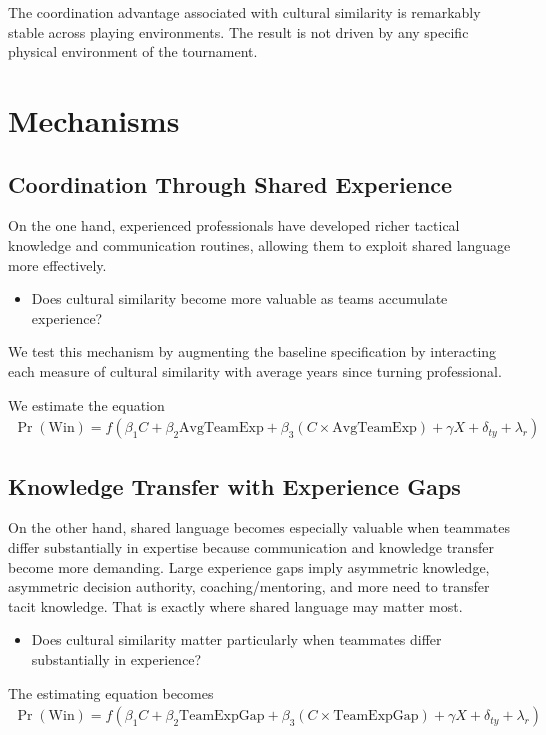 \documentclass[10pt]{article}
\begin{document}
The coordination advantage associated with cultural similarity is remarkably stable across playing environments. The result is not driven by any specific physical environment of the tournament.

\section{Mechanisms}
\subsection{Coordination Through Shared Experience} 


On the one hand, experienced professionals have developed richer tactical knowledge and communication routines, allowing them to exploit shared language more effectively. 

\begin{itemize}

\item Does cultural similarity become more valuable as teams accumulate experience? 
\end{itemize}
We test this mechanism by augmenting the baseline specification by interacting each measure of cultural similarity with average years since turning professional.

We estimate the equation 
\begin{align}
\operatorname{Pr}(\text{Win}) = f(\beta_1 C + \beta_2 \text{AvgTeamExp} + \beta_3 (C \times \text{AvgTeamExp}) + \gamma X + \delta_{ty} + \lambda_r)
\end{align}
\subsection{Knowledge Transfer with Experience Gaps} 

On the other hand, shared language becomes especially valuable when teammates differ substantially in expertise because communication and knowledge transfer become more demanding. Large experience gaps imply asymmetric knowledge, asymmetric decision authority, coaching/mentoring,
 and more need to transfer tacit knowledge. That is exactly where shared language may matter most.
\begin{itemize}
\item Does cultural similarity matter particularly when teammates differ substantially in experience?
\end{itemize}
The estimating equation becomes
\begin{align}
\operatorname{Pr}(\text{Win}) = f(\beta_1 C + \beta_2 \text{TeamExpGap} + \beta_3 (C \times \text{TeamExpGap}) + \gamma X + \delta_{ty} + \lambda_r)
\end{align}
\end{document}
